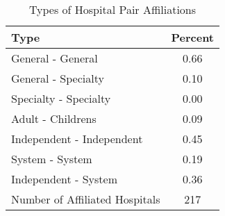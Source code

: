 \begin{table}[ht!]
\centering
\caption{Types of Hospital Pair Affiliations\label{tab:hospital_pair_types}}
\centering
\begin{tabular}[t]{lc}
\toprule
Type  & Percent\\
\midrule
General - General & 0.66\\
General - Specialty & 0.10\\
Specialty - Specialty & 0.00\\
\addlinespace[0.5em]
Adult - Childrens & 0.09\\
\addlinespace[0.5em]
Independent - Independent & 0.45\\
System - System & 0.19\\
Independent - System & 0.36\\
\addlinespace[0.5em]
Number of Affiliated Hospitals & 217\\
\bottomrule
\end{tabular}
\end{table}